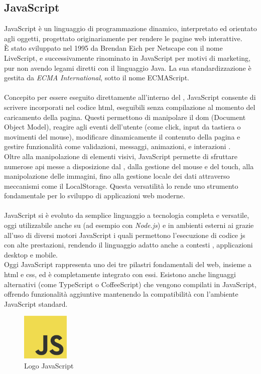 \subsection{JavaScript}
\noindent JavaScript è un linguaggio di programmazione dinamico, interpretato ed orientato agli oggetti, progettato originariamente per rendere le pagine web interattive.\\ 
È stato sviluppato nel 1995 da Brendan Eich per Netscape con il nome LiveScript, e successivamente rinominato in JavaScript per motivi di marketing, pur non avendo legami diretti con il linguaggio Java. La sua standardizzazione è gestita da \textit{ECMA International}, sotto il nome ECMAScript.\\
\\
Concepito per essere eseguito direttamente all’interno del , JavaScript consente di scrivere  incorporati nel codice \acrshort{html}, eseguibili senza compilazione al momento del caricamento della pagina. Questi  permettono di manipolare il \acrshort{dom} (Document Object Model), reagire agli eventi dell’utente (come click, input da tastiera o movimenti del mouse), modificare dinamicamente il contenuto della pagina e gestire funzionalità come validazioni, messaggi, animazioni, e interazioni .\\
Oltre alla manipolazione di elementi visivi, JavaScript permette di sfruttare numerose \acrshort{api} messe a disposizione dal , dalla gestione del mouse e del touch, alla manipolazione delle immagini, fino alla gestione locale dei dati attraverso meccanismi come il LocalStorage. Questa versatilità lo rende uno strumento fondamentale per lo sviluppo di applicazioni web moderne.\\
\\
JavaScript si è evoluto da semplice linguaggio  a tecnologia completa e versatile, oggi utilizzabile anche su  (ad esempio con \textit{Node.js}) e in ambienti esterni ai  grazie all’uso di diversi motori JavaScript i quali permettono l’esecuzione di codice \acrshort{js} con alte prestazioni, rendendo il linguaggio adatto anche a contesti , applicazioni desktop e mobile.\\
Oggi JavaScript rappresenta uno dei tre pilastri fondamentali del web, insieme a \acrshort{html} e \acrshort{css}, ed è completamente integrato con essi. Esistono anche linguaggi alternativi (come TypeScript o CoffeeScript) che vengono compilati in JavaScript, offrendo funzionalità aggiuntive mantenendo la compatibilità con l’ambiente JavaScript standard.
\begin{figure}[H]
    \centering
    \includegraphics[width=0.2\textwidth]{img/javascript.png}
    \caption[Logo JavaScript]{Logo JavaScript}
\end{figure}

